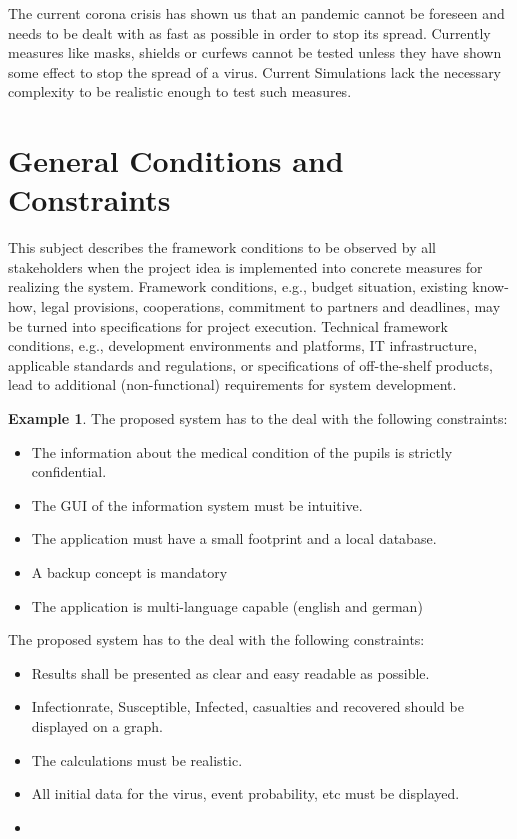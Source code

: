 \documentclass[12pt]{article}
\theoremstyle{definition}
\newtheorem{example}{Example}
\newenvironment{explanation}{%
   \setlength{\parindent}{0pt}
   \itshape
   \color{blue}
}{}
\begin{document}
\vspace{2em}

The current corona crisis has shown us that an pandemic cannot be foreseen and needs to be dealt with as fast as possible in order to stop its spread.
Currently measures like masks, shields or curfews cannot be tested unless they have shown some effect to stop the spread of a virus.
Current Simulations lack the necessary complexity to be realistic enough to test such measures.

\pagebreak

\section{General Conditions and Constraints}
\begin{explanation}
This subject describes the framework conditions to be observed by all stakeholders when the project idea is implemented into concrete measures for realizing the system. Framework conditions, e.g., budget situation, existing know-how, legal provisions, cooperations, commitment to partners and deadlines, may be turned into specifications for project execution.
Technical framework conditions, e.g., development environments and platforms, IT infrastructure, applicable standards and regulations, or specifications of off-the-shelf products, lead to additional (non-functional) requirements for system development.
\end{explanation}

\begin{example}
The proposed system has to the deal with the following constraints:
\begin{itemize}
\item The information about the medical condition of the pupils is strictly confidential.
\item The GUI of the information system must be intuitive.
\item The application must have a small footprint and a local database.
\item A backup concept is mandatory
\item The application is multi-language capable (english and german)
\end{itemize}
\end{example}

\vspace{2em}

The proposed system has to the deal with the following constraints:
\begin{itemize}
\item Results shall be presented as clear and easy readable as possible.
\item Infectionrate, Susceptible, Infected, casualties and recovered should be displayed on a graph.
\item The calculations must be realistic.
\item All initial data for the virus, event probability, etc must be displayed.
\item 
\end{itemize}
\end{document}
